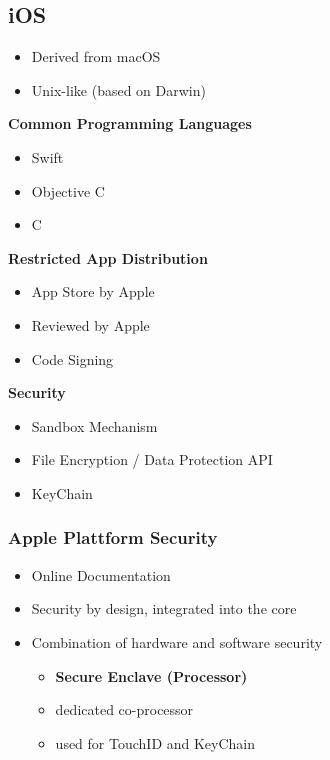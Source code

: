 \subsection{iOS}
\begin{itemize}
    \item Derived from macOS
    \item Unix-like (based on Darwin)
\end{itemize}
\textbf{Common Programming Languages}
\begin{itemize}
    \item Swift
    \item Objective C
    \item C
\end{itemize}
\textbf{Restricted App Distribution}
\begin{itemize}
    \item App Store by Apple
    \item Reviewed by Apple
    \item Code Signing
\end{itemize}
\textbf{Security}
\begin{itemize}
    \item Sandbox Mechanism
    \item File Encryption / Data Protection API
    \item KeyChain
\end{itemize}

\subsubsection{Apple Plattform Security}
\begin{itemize}
    \item Online Documentation
    \item Security by design, integrated into the core
    \item Combination of hardware and software security
    \begin{itemize}
        \item \textbf{Secure Enclave (Processor)}
        \item dedicated co-processor
        \item used for TouchID and KeyChain
    \end{itemize}
\end{itemize}

